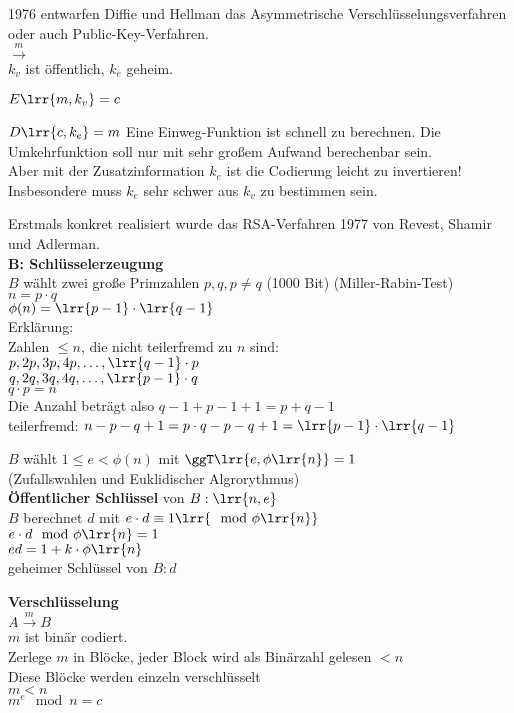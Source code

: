 	1976 entwarfen Diffie und Hellman das Asymmetrische Verschlüsselungsverfahren oder auch Public-Key-Verfahren.\\
	$\overset{m}{\longrightarrow}$ \\
	$k_v$ ist öffentlich, $k_e$ geheim.
		\item $E\lrr{m,k_v}=c$
		\item $D\lrr{c,k_e}=m$
	\subExEnd
	Eine Einweg-Funktion ist schnell zu berechnen. Die Umkehrfunktion soll nur mit sehr großem Aufwand berechenbar sein.\\
	Aber mit der Zusatzinformation $k_e$ ist die Codierung leicht zu invertieren!\\
	Insbesondere muss $k_e$ sehr schwer aus $k_v$ zu bestimmen sein.
	
	Erstmals konkret realisiert wurde das RSA-Verfahren 1977 von Revest, Shamir und Adlerman.\\
	\textbf{B: Schlüsselerzeugung}\\
	$B$ wählt zwei große Primzahlen $p,q,p\neq q$ (1000 Bit)
	(Miller-Rabin-Test)\\
	$n=p\cdot q$\\
	$\phi(n)=\lrr{p-1}\cdot\lrr{q-1}$\\
	Erklärung:\\
	Zahlen $\leq n$, die nicht teilerfremd zu $n$ sind:\\
	$p,2p,3p,4p,\dots,\lrr{q-1}\cdot p$\\
	$q,2q,3q,4q,\dots,\lrr{p-1}\cdot q$\\
	$q\cdot p = n$\\
	Die Anzahl beträgt also $q-1+p-1+1 = p+q-1$\\
	teilerfremd:
	$n-p-q+1=p\cdot q-p-q+1=\lrr{p-1}\cdot\lrr{q-1}$
	
	$B$ wählt $1\leq e<\phi(n)$ mit $\ggT\lrr{e,\phi\lrr{n}}=1$\\
	(Zufallswahlen und Euklidischer Algrorythmus)\\
	\textbf{Öffentlicher Schlüssel} von $B:\lrr{n,e}$\\
	$B$ berechnet $d$ mit $e\cdot d\equiv 1\lrr{\mod\phi\lrr{n}}$\\
	$e\cdot d\mod\phi\lrr{n}=1$\\
	$ed=1+k\cdot\phi\lrr{n}$\\
	geheimer Schlüssel von $B:d$
	
	\textbf{Verschlüsselung}\\
	$A\overset{m}{\rightarrow}B$\\
	$m$ ist binär codiert.\\
	Zerlege $m$ in Blöcke, jeder Block wird als Binärzahl gelesen $<n$\\
	Diese Blöcke werden einzeln verschlüsselt\\
	$m<n$\\
	$m^e\mod n=c$
	
